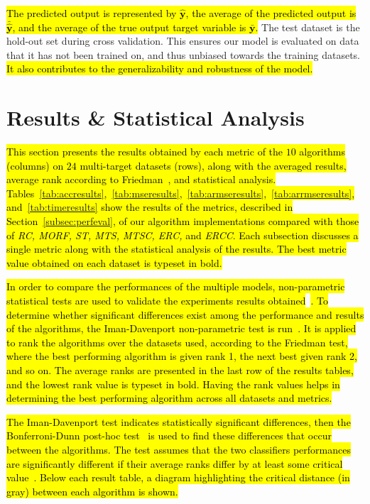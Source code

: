 \documentclass[preprint,12pt]{elsarticle}
\begin{document}
\hl{The predicted output is represented by $\hat{\textbf{y}}$, the average of the predicted output is $\bar{\hat{\textbf{y}}}$, and the average of the true output target variable is $\bar{\textbf{y}}$.} The test dataset is the hold-out set during cross validation. This ensures our model is evaluated on data that it has not been trained on, and thus unbiased towards the training datasets. \hl{It also contributes to the generalizability and robustness of the model.}

\section{Results \& Statistical Analysis}\label{sec:results}
\hl{This section presents the results obtained by each metric of the $10$ algorithms (columns) on $24$ multi-target datasets (rows), along with the averaged results, average rank according to Friedman~{\cite{Garcia20102044}}, and statistical analysis. Tables~{\ref{tab:accresults}},~{\ref{tab:mseresults}},~{\ref{tab:armseresults}},~{\ref{tab:arrmseresults}}, and~{\ref{tab:timeresults}} show the results of the metrics, described in Section~{\ref{subsec:perfeval}}, of our algorithm implementations compared with those of \textit{RC, MORF, ST, MTS, MTSC, ERC,} and \textit{ERCC}. Each subsection discusses a single metric along with the statistical analysis of the results. The best metric value obtained on each dataset is typeset in bold.}

\hl{In order to compare the performances of the multiple models, non-parametric statistical tests are used to validate the experiments results obtained}~\cite{Derrac2011,Garcia20102044}\hl{. To determine whether significant differences exist among the performance and results of the algorithms, the Iman-Davenport non-parametric test is run~{\cite{Garcia2008}}. It is applied to rank the algorithms over the datasets used, according to the Friedman test, where the best performing algorithm is given rank 1, the next best given rank 2, and so on. The average ranks are presented in the last row of the results tables, and the lowest rank value is typeset in bold. Having the rank values helps in determining the best performing algorithm across all datasets and metrics.}

\hl{The Iman-Davenport test indicates statistically significant differences, then the Bonferroni-Dunn post-hoc test~{\cite{Dunn1961}} is used to find these differences that occur between the algorithms. The test assumes that the two classifiers performances are significantly different if their average ranks differ by at least some critical value~{\cite{Garcia2009}}. Below each result table, a diagram highlighting the critical distance (in gray) between each algorithm is shown.  }
\end{document}
